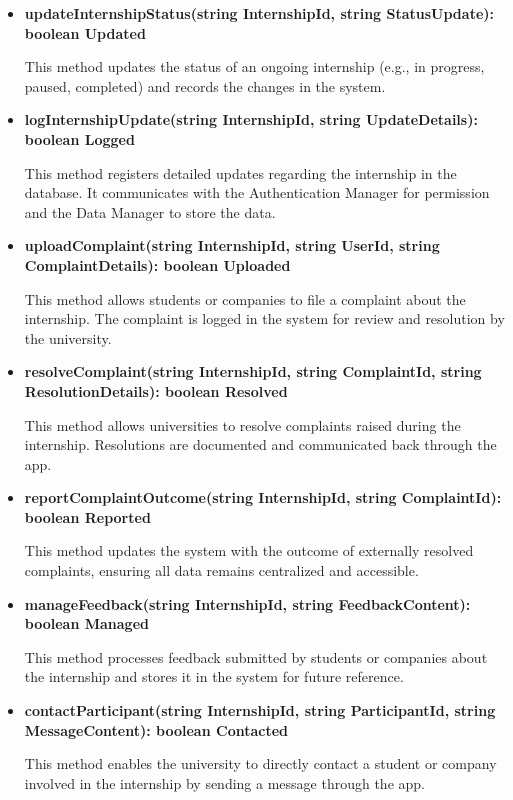 \begin{itemize}
\begin{itemize}
    \item \textbf{updateInternshipStatus(string InternshipId, string StatusUpdate): boolean Updated}

    This method updates the status of an ongoing internship (e.g., in progress, paused, completed) and records the changes in the system.

    \item \textbf{logInternshipUpdate(string InternshipId, string UpdateDetails): boolean Logged}

    This method registers detailed updates regarding the internship in the database. It communicates with the Authentication Manager for permission and the Data Manager to store the data.

    \item \textbf{uploadComplaint(string InternshipId, string UserId, string ComplaintDetails): boolean Uploaded}

    This method allows students or companies to file a complaint about the internship. The complaint is logged in the system for review and resolution by the university.

    \item \textbf{resolveComplaint(string InternshipId, string ComplaintId, string ResolutionDetails): boolean Resolved}

    This method allows universities to resolve complaints raised during the internship. Resolutions are documented and communicated back through the app.

    \item \textbf{reportComplaintOutcome(string InternshipId, string ComplaintId): boolean Reported}

    This method updates the system with the outcome of externally resolved complaints, ensuring all data remains centralized and accessible.

    \item \textbf{manageFeedback(string InternshipId, string FeedbackContent): boolean Managed}

    This method processes feedback submitted by students or companies about the internship and stores it in the system for future reference.

    \item \textbf{contactParticipant(string InternshipId, string ParticipantId, string MessageContent): boolean Contacted}

    This method enables the university to directly contact a student or company involved in the internship by sending a message through the app.


\end{itemize}
\end{itemize}
